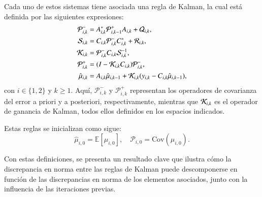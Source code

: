 Cada uno de estos sistemas tiene asociada una regla de Kalman, la cual está definida por las siguientes expresiones:  
\begin{equation*}
	\begin{aligned}
		\mathcal{P}_{i,k}^- &= A_{i,k}^* \mathcal{P}_{i,k-1}^+ A_{i,k} + \mathcal{Q}_{i,k}, \\
		\mathcal{S}_{i,k} &= C_{i,k} \mathcal{P}_{i,k}^- C_{i,k}^* + \mathcal{R}_{i,k}, \\
		\mathcal{K}_{i,k} &= \mathcal{P}_{i,k}^- C_{i,k} \mathcal{S}_{i,k}^{-1}, \\
		\mathcal{P}_{i,k}^+ &= (I - \mathcal{K}_{i,k} C_{i,k}) \mathcal{P}_{i,k}^-, \\
		\hat{\mu}_{i,k} &= A_{i,k} \hat{\mu}_{i,k-1} + \mathcal{K}_{i,k} (y_{i,k} - C_{i,k} \hat{\mu}_{i,k-1}),
	\end{aligned}
\end{equation*}
con $i \in \{1,2\}$ y $k \geq 1$. Aquí, $\mathcal{P}_{i,k}^-$ y $\mathcal{P}_{i,k}^+$ representan los operadores de covarianza del error a priori y a posteriori, respectivamente, mientras que $\mathcal{K}_{i,k}$ es el operador de ganancia de Kalman, todos ellos definidos en los espacios indicados.

Estas reglas se inicializan como sigue:
\begin{equation*}
	\hat{\mu}_{i,0} = \mathbb{E}[\mu_{i,0}], \quad \mathcal{P}_{i,0} = \text{Cov}(\mu_{i,0}).
\end{equation*}

Con estas definiciones, se presenta un resultado clave que ilustra cómo la discrepancia en norma entre las reglas de Kalman puede descomponerse en función de las discrepancias en norma de los elementos asociados, junto con la influencia de las iteraciones previas.


